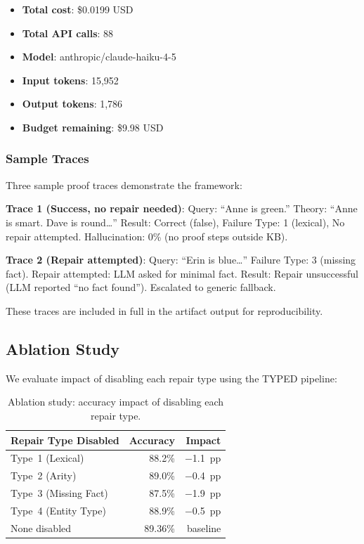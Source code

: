 \documentclass[11pt,letterpaper]{article}
\begin{document}
\begin{itemize}
  \item \textbf{Total cost}: \$0.0199 USD
  \item \textbf{Total API calls}: 88
  \item \textbf{Model}: anthropic/claude-haiku-4-5
  \item \textbf{Input tokens}: 15,952
  \item \textbf{Output tokens}: 1,786
  \item \textbf{Budget remaining}: \$9.98 USD
\end{itemize}

\subsubsection{Sample Traces}

Three sample proof traces demonstrate the framework:

\textbf{Trace 1 (Success, no repair needed)}: Query: ``Anne is green.'' Theory: ``Anne is smart. Dave is round\ldots'' Result: Correct (false), Failure Type: 1 (lexical), No repair attempted. Hallucination: 0\% (no proof steps outside KB).

\textbf{Trace 2 (Repair attempted)}: Query: ``Erin is blue\ldots'' Failure Type: 3 (missing fact). Repair attempted: LLM asked for minimal fact. Result: Repair unsuccessful (LLM reported ``no fact found''). Escalated to generic fallback.

These traces are included in full in the artifact output for reproducibility.

\subsection{Ablation Study}

We evaluate impact of disabling each repair type using the TYPED pipeline:

\begin{table}[!htbp]
  \centering
  \caption{Ablation study: accuracy impact of disabling each repair type.}
  \label{tab:ablation}
  \begin{tabular}{lrr}
    \toprule
    Repair Type Disabled & Accuracy & Impact \\
    \midrule
    Type~1 (Lexical)      & 88.2\% & $-$1.1~pp \\
    Type~2 (Arity)        & 89.0\% & $-$0.4~pp \\
    Type~3 (Missing Fact) & 87.5\% & $-$1.9~pp \\
    Type~4 (Entity Type)  & 88.9\% & $-$0.5~pp \\
    None disabled         & 89.36\% & baseline \\
    \bottomrule
  \end{tabular}
\end{table}
\end{document}
